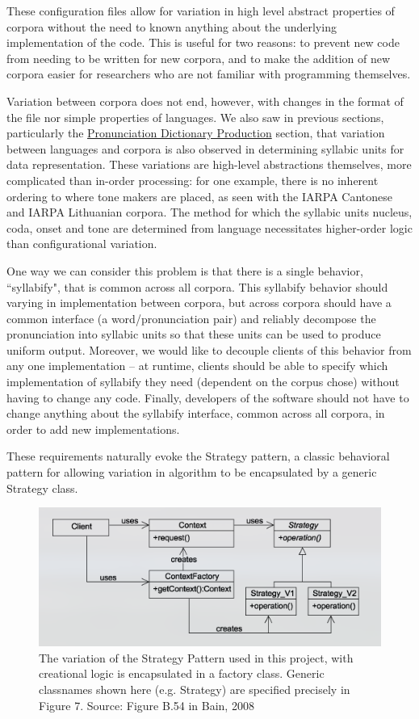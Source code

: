 \documentclass[11pt]{article}
\begin{document}
These configuration files allow for variation in high level abstract properties of corpora without the need to known anything about the underlying implementation of the code. This is useful for two reasons: to prevent new code from needing to be written for new corpora, and to make the addition of new corpora easier for researchers who are not familiar with programming themselves.

Variation between corpora does not end, however, with changes in the format of the file nor simple properties of languages. We also saw in previous sections, particularly the \hyperlink{section.24}{Pronunciation Dictionary Production} section, that variation between languages and corpora is also observed in determining syllabic units for data representation. These variations are high-level abstractions themselves, more complicated than in-order processing: for one example, there is no inherent ordering to where tone makers are placed, as seen with the IARPA Cantonese and IARPA Lithuanian corpora. The method for which the syllabic units nucleus, coda, onset and tone are determined from language necessitates higher-order logic than configurational variation.

One way we can consider this problem is that there is a single behavior, ``syllabify", that is common across all corpora. This syllabify behavior should varying in implementation between corpora, but across corpora should have a common interface (a word/pronunciation pair) and reliably decompose the pronunciation into syllabic units so that these units can be used to produce uniform output. Moreover, we would like to decouple clients of this behavior from any one implementation -- at runtime, clients should be able to specify which implementation of syllabify they need (dependent on the corpus chose) without having to change any code. Finally, developers of the software should not have to change anything about the syllabify interface, common across all corpora, in order to add new implementations.

These requirements naturally evoke the Strategy pattern\cite{freeman_head_2004}, a classic behavioral pattern for allowing variation in algorithm to be encapsulated by a generic Strategy class.

\begin{figure}[h]
\centering
\includegraphics[scale=0.5]{strategy-pattern.png}
\caption{The variation of the Strategy Pattern used in this project, with creational logic is encapsulated in a factory class. Generic classnames shown here (e.g. Strategy) are specified precisely in Figure 7. Source: Figure B.54 in Bain, 2008\cite{bain_emergent_2008}}
\label{fig:strategy-pattern}
\end{figure}
\end{document}
